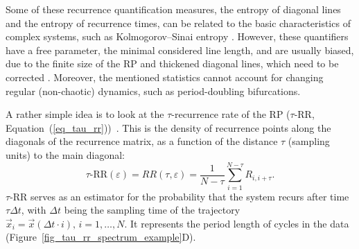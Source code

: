 \documentclass[entropy,article,accept,pdftex,moreauthors]{Definitions/mdpi}
\begin{document}
Some of these recurrence quantification measures, the entropy of diagonal lines and the entropy of 
recurrence times, can be related to the basic characteristics of complex systems, such as Kolmogorov--Sinai entropy \cite{march2005,baptista2010}. However, these quantifiers have a free parameter, the minimal considered line length, and 
are usually biased, due to the finite size of the RP and thickened diagonal lines, which need to be corrected \cite{Kraemer2019}. Moreover, the mentioned statistics cannot account for 
changing regular (non-chaotic) dynamics, such as period-doubling bifurcations.

A rather simple idea is to look at the $\tau$-recurrence rate of the RP ($\tau$-RR, Equation~(\ref{eq_tau_rr}))~\cite{marwan2002pla,Zbilut2008}.
This is the density of recurrence points along the diagonals of the recurrence matrix, as a function of the distance $\tau$ (sampling units) to the main diagonal:
\begin{equation}\label{eq_tau_rr}
\tau\text{-RR}(\varepsilon) = RR(\tau, \varepsilon) = \frac{1}{N-\tau} \sum_{i=1}^{N-\tau	} R_{i,i+\tau}.
\end{equation}
$\tau$-RR serves as an estimator for the probability that the system recurs after time $\tau \Delta t$, with $\Delta t$ being the sampling time of the trajectory 
$\vec{x}_i = \vec{x}(\Delta t \cdot i),\, i=1,\ldots,N$. 
It represents the period length of cycles in the data (Figure~\ref{fig_tau_rr_spectrum_example}D).
\end{document}
